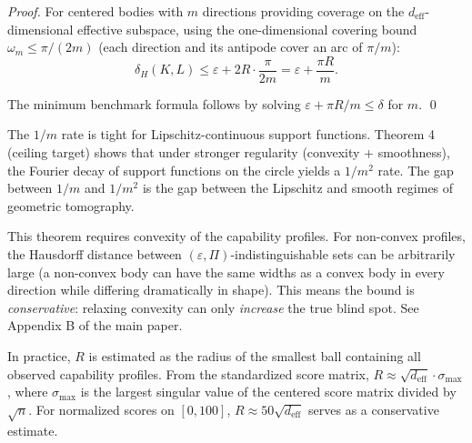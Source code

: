 \begin{proof}
For centered bodies with $m$ directions providing coverage on the $d_{\mathrm{eff}}$-dimensional effective subspace, using the one-dimensional covering bound $\omega_m \leq \pi/(2m)$ (each direction and its antipode cover an arc of $\pi/m$):
\[
  \delta_H(K, L) \leq \varepsilon + 2R \cdot \frac{\pi}{2m} = \varepsilon + \frac{\pi R}{m}.
\]

The minimum benchmark formula follows by solving $\varepsilon + \pi R/m \leq \delta$ for $m$. \qed
\end{proof}

\begin{remark}[Tightness]
The $1/m$ rate is tight for Lipschitz-continuous support functions. Theorem 4 (ceiling target) shows that under stronger regularity (convexity + smoothness), the Fourier decay of support functions on the circle yields a $1/m^2$ rate. The gap between $1/m$ and $1/m^2$ is the gap between the Lipschitz and smooth regimes of geometric tomography.
\end{remark}

\begin{remark}
This theorem requires convexity of the capability profiles. For non-convex profiles, the Hausdorff distance between $(\varepsilon, \Pi)$-indistinguishable sets can be arbitrarily large (a non-convex body can have the same widths as a convex body in every direction while differing dramatically in shape). This means the bound is \emph{conservative}: relaxing convexity can only \emph{increase} the true blind spot. See Appendix B of the main paper.
\end{remark}

\begin{remark}[Estimating $R$]
In practice, $R$ is estimated as the radius of the smallest ball containing all observed capability profiles. From the standardized score matrix, $R \approx \sqrt{d_{\mathrm{eff}}} \cdot \sigma_{\max}$, where $\sigma_{\max}$ is the largest singular value of the centered score matrix divided by $\sqrt{n}$. For normalized scores on $[0, 100]$, $R \approx 50\sqrt{d_{\mathrm{eff}}}$ serves as a conservative estimate.
\end{remark}



